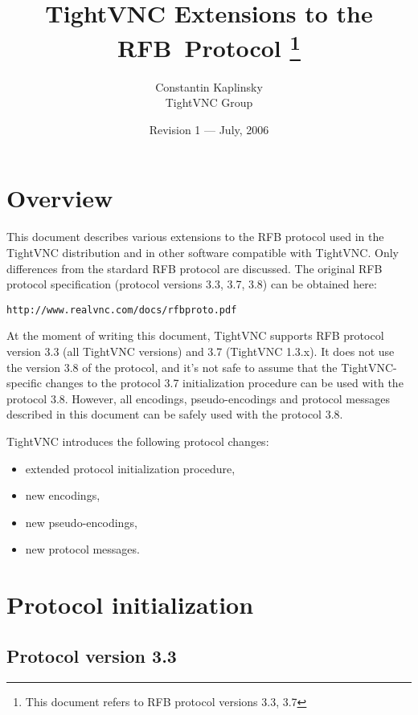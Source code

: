 \documentclass[a4paper]{article}
\begin{document}
\title{TightVNC Extensions to the RFB~Protocol
       \thanks{This document refers to RFB protocol versions 3.3, 3.7}}
\author{Constantin Kaplinsky\\
        TightVNC Group}
\date{Revision 1 --- July, 2006}
\maketitle

\tableofcontents

\newpage
\section{Overview}
This document describes various extensions to the RFB protocol used in
the TightVNC distribution and in other software compatible with
TightVNC. Only differences from the stardard RFB protocol are
discussed. The original RFB protocol specification (protocol versions
3.3, 3.7, 3.8) can be obtained here:
\begin{center}
\texttt{http://www.realvnc.com/docs/rfbproto.pdf}
\end{center}

At the moment of writing this document, TightVNC supports RFB protocol
version 3.3 (all TightVNC versions) and 3.7 (TightVNC 1.3.x). It does
not use the version 3.8 of the protocol, and it's not safe to assume
that the TightVNC-specific changes to the protocol 3.7 initialization
procedure can be used with the protocol 3.8. However, all encodings,
pseudo-encodings and protocol messages described in this document can
be safely used with the protocol 3.8.

TightVNC introduces the following protocol changes:
\begin{itemize}
\item extended protocol initialization procedure,
\item new encodings,
\item new pseudo-encodings,
\item new protocol messages.
\end{itemize}

\newpage
\section{Protocol initialization}

\subsection{Protocol version 3.3}
\end{document}
